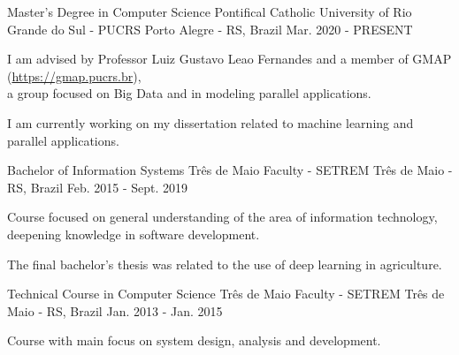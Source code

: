 
\begin{cventries}
	\cventry
	{Master's Degree in Computer Science} %
	{Pontifical Catholic University of Rio Grande do Sul - PUCRS} %
	{Porto Alegre - RS, Brazil} %
	{Mar. 2020 - PRESENT} %
	{
		\begin{cvitems} %
			\item {I am advised by Professor Luiz Gustavo Leao Fernandes and a member of GMAP (\href{https://gmap.pucrs.br}{https://gmap.pucrs.br}),\\a group focused on Big Data and in modeling parallel applications.}
			\item {I am currently working on my dissertation related to machine learning and parallel applications.}
		\end{cvitems}
	}

	\cventry
	{Bachelor of Information Systems} %
	{Três de Maio Faculty - SETREM} %
	{Três de Maio - RS, Brazil} %
	{Feb. 2015 - Sept. 2019} %
	{
		\begin{cvitems} %
			\item {Course focused on general understanding of the area of information technology,\\deepening knowledge in software development.}
			\item {The final bachelor's thesis was related to the use of deep learning in agriculture.}
		\end{cvitems}
	}

	\cventry
	{Technical Course in Computer Science} %
	{Três de Maio Faculty - SETREM} %
	{Três de Maio - RS, Brazil} %
	{Jan. 2013 - Jan. 2015} %
	{
		\begin{cvitems} %
			\item {Course with main focus on system design, analysis and development.}
		\end{cvitems}
	}
\end{cventries}
